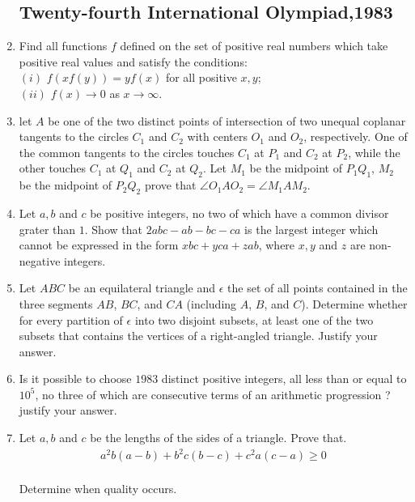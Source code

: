 \documentclass[12pt,-letter paper]{article}
\providecommand{\brak}[1]{\ensuremath{\left(#1\right)}}
\begin{document}
\begin{enumerate}

 \subsection*{Twenty-fourth International Olympiad,1983}
\item Find all functions $f$ defined on the set of positive real numbers which take positive real values and satisfy the conditions:\\
$\brak{i}$ $f\brak{xf\brak{y}} = yf\brak{x}$ for all positive $x,y$;\\
$\brak{ii}$ $f\brak{x} \rightarrow 0 $ as $ x \rightarrow \infty$.
\item let $A$ be one of the two distinct points of intersection of two unequal coplanar tangents to the circles $C_1$ and $C_2$ with centers $O_1$ and $O_2$, respectively. One of the common tangents to the circles touches $C_1$ at $P_1$ and $C_2$ at $P_2$, while the other touches $C_1$ at $Q_1$ and $C_2$ at $Q_2$.  Let $M_1$ be the midpoint of $P_1Q_1$, $M_2$ be the midpoint of $P_2Q_2$ prove that $\angle O_1AO_2 = \angle M_1AM_2$.
\item Let $a,b$ and $c$ be positive integers, no two of which have a  common divisor grater than $1$. Show that $2abc-ab-bc-ca$ is the largest integer which cannot be expressed in the form $xbc+yca+zab$, where $x,y$ and $z$ are non-negative integers.	
\item Let $ABC$ be an equilateral triangle and $\epsilon$ the set of all points contained in the three segments $AB$, $BC$, and $CA$ (including $A$, $B$, and $C$). Determine whether for every partition of $\epsilon$ into two disjoint subsets, at least one of the two subsets that contains the vertices of a right-angled triangle. Justify your answer.
\item Is it possible to choose $1983$ distinct positive integers, all less than or equal to $10^5$, no three of which are consecutive terms of an arithmetic progression ? justify your answer.	
\item Let $a,b$ and $c$ be the lengths of the sides of a triangle. Prove that.
	\begin{align*} a^2b \brak {a-b}+b^2c\brak{b-c}+c^2a\brak{c-a}\geq 0 \end{align*}
		\\Determine when quality occurs.










\end{enumerate}
\end{document}

